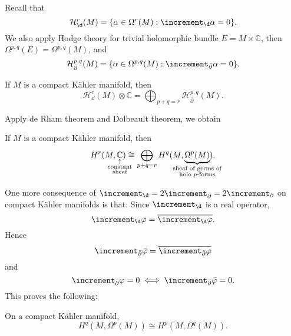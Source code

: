 \documentclass[12pt]{article}
\begin{document}
Recall that \[
  \mathcal{H}_{\dd{}}^{r}(M)=\{\alpha\in \Omega^r(M):\lap_{\dd{}}\alpha=0\}
.\] We also apply Hodge theory for trivial holomorphic bundle \(E=M\times \mathbb{C}\),
then \(\Omega^{p,q}(E)=\Omega^{p,q}(M)\), and \[
  \mathcal{H}_{\bar{\partial}}^{p,q}(M)=\{\alpha\in \Omega^{p,q}(M):
  \lap_{\bar{\partial}}\alpha=0\}
.\] 
\begin{corollary}
  If \(M\) is a compact K\"ahler manifold, then \[
    \mathcal{H}_{\dd{}}^{r}(M)\otimes \mathbb{C}
    =\bigoplus_{p+q=r}\mathcal{H}_{\bar{\partial}}^{p,q}(M)
  .\] 
\end{corollary}
Apply de Rham theorem and Dolbeault theorem, we obtain
\begin{corollary}
  If \(M\) is a compact K\"ahler manifold, then \[
    H^{r}(M,\underset{\mathclap{\substack{\uparrow\\\text{constant}\\\text{sheaf}}}}
    {\mathbb{C}})\cong\bigoplus_{p+q=r}H^q(M,\underbrace{\Omega^{p}(M)}_{\mathclap{
    \substack{\text{sheaf of germs of}\\\text{holo }p\text{-forms}}}})
  .\] 
\end{corollary}

One more consequence of \(\lap_{\dd{}}=2\lap_{\bar{\partial}}=2\lap_{\partial}\) on
compact K\"ahler manifolds is that: Since \(\lap_{\dd{}}\) is a real operator, \ie\ \[
  \lap_{\dd{}}\bar{\vphi}=\overline{\lap_{\dd{}}\vphi}
.\] Hence \[
  \lap_{\bar{\partial}}\bar{\vphi}=\overline{\lap_{\bar{\partial}}\vphi}
\] and \[
  \lap_{\bar{\partial}}\vphi=0\iff \lap_{\bar{\partial}}\bar{\vphi}=0
.\] This proves the following:
\begin{theorem}
  On a compact K\"ahler manifold, \[
    H^{q}(M,\Omega^{p}(M))\cong H^{p}(M,\Omega^q(M))
  .\] 
\end{theorem}
\end{document}
